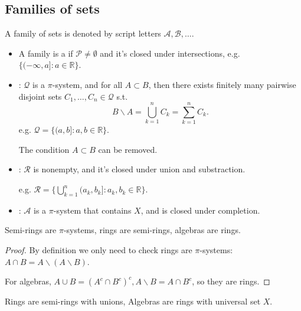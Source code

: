 \subsection{Families of sets}
\label{sub:Families of sets}
\begin{definition}
	A family of sets is denoted by script letters $\mathscr{A},\mathscr{B},\dots$.

	\begin{itemize}
		\item A family is a  if  $\mathscr{P}\ne \emptyset$ and
			it's closed under intersections, e.g.
			$\{(-\infty, a]: a\in \mathbb{R}\}$.
		\item {}: $\mathscr{Q}$ is a $\pi$-system, and for all
			$A \subset B$, then there exists finitely many pairwise disjoint sets
			$C_1,\dots,C_n\in \mathscr{Q}$ s.t.
			\[
			B\backslash A = \bigcup_{k=1}^n C_k = \sum_{k=1}^n C_k.
			\]
			e.g. $\mathscr{Q}= \{(a,b]:a,b\in \mathbb{R}\}$.
			\begin{remark}
				The condition $A \subset B$ can be removed.
			\end{remark}
		\item {}: $\mathscr{R}$ is nonempty, and it's closed under
			union and substraction.

			e.g. $\mathscr{R} = \{\bigcup_{k=1}^n (a_k,b_k]:a_k,b_k\in \mathbb{R}\}$.
		\item {}: $\mathscr{A}$ is a $\pi$-system that contains
			$X$, and is closed under completion.
	\end{itemize}
\end{definition}

\begin{proposition}
	Semi-rings are $\pi$-systems, rings are semi-rings, algebras are rings.
\end{proposition}
\begin{proof}[Proof]
    By definition we only need to check rings are $\pi$-systems:
	$A\cap B = A\backslash (A\backslash B)$.

	For algebras, $A\cup B = (A^c\cap B^c)^c, A\backslash B = A\cap B^c$,
	so they are rings.
\end{proof}
\begin{remark}
    Rings are semi-rings with unions, Algebras are rings with universal set $X$.
\end{remark}

